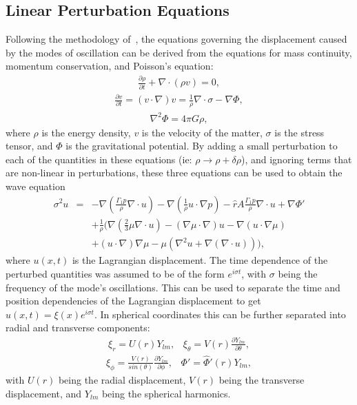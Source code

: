 \documentclass[fleqn,usenatbib]{mnras}
\begin{document}
\subsection{Linear Perturbation Equations}
\hspace{\parindent}Following the methodology of~\cite{mcdermott1988nonradial}, the equations governing the displacement caused by the modes of oscillation can be derived from the equations for mass continuity, momentum conservation, and Poisson's equation:
\begin{align}
\frac{\partial\rho}{\partial t}+\nabla\cdot(\rho v)=0,
\label{eq:continuity_eqn}
\end{align}
\begin{align}
\frac{\partial v}{\partial t}=(v\cdot \nabla)v=\frac{1}{\rho}\nabla\cdot\sigma-\nabla\Phi,
\label{eq:momentum_eqn}
\end{align}
\begin{align}
\nabla^2\Phi=4\pi G\rho,
\label{eq:Poisson_eqn}
\end{align}
\noindent where $\rho$ is the energy density, $v$ is the velocity of the matter, $\sigma$ is the stress tensor, and $\Phi$ is the gravitational potential. By adding a small perturbation to each of the quantities in these equations (ie: $\rho\rightarrow\rho+\delta\rho$), and ignoring terms that are non-linear in perturbations, these three equations can be used to obtain the wave equation
\begin{eqnarray}\nonumber
\sigma^2 u&=& -\nabla\left(\frac{\Gamma_1 p}{\rho}\nabla\cdot u\right)-\nabla\left(\frac{1}{\rho}u\cdot\nabla p\right)-\hat{r}A\frac{\Gamma_1 p}{\rho}\nabla\cdot u+\nabla\Phi '\\\nonumber
&&+\frac{1}{\rho}\biggr(\nabla\left(\frac{2}{3}\mu\nabla\cdot u\right)-\left(\nabla\mu\cdot\nabla\right)u-\nabla\left(u\cdot\nabla\mu\right)\\
&&+\left(u\cdot\nabla\right)\nabla\mu-\mu\left(\nabla^2 u+\nabla\left(\nabla\cdot u\right)\right)\biggr),
\label{eq:wave_eqn}
\end{eqnarray}
where $u(x,t)$ is the Lagrangian displacement. The time dependence of the perturbed quantities was assumed to be of the form $e^{i\sigma t}$, with $\sigma$ being the frequency of the mode's oscillations. This can be used to separate the time and position dependencies of the Lagrangian displacement to get $u(x,t)=\xi(x)e^{i\sigma t}$. In spherical coordinates this can be further separated into radial and transverse components:
\begin{align}\nonumber
\xi_r=U(r)Y_{lm},\;\;\;\xi_{\theta}=V(r)\frac{\partial Y_{lm}}{\partial\theta},
\end{align}
\begin{align}
\xi_{\phi}=\frac{V(r)}{sin(\theta)}\frac{\partial Y_{lm}}{\partial\phi},\;\;\;\Phi '=\hat{\Phi}'(r)Y_{lm},
\label{eq:xi_seperation}
\end{align}
\noindent with $U(r)$ being the radial displacement, $V(r)$ being the transverse displacement, and $Y_{lm}$ being the spherical harmonics.
\end{document}
